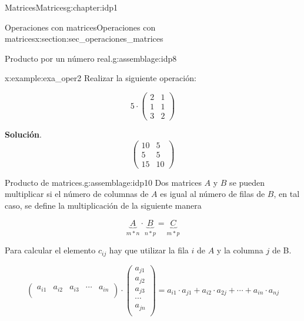 \documentclass[oneside,12pt,]{book}
\newcommand{\blocktitlefont}{\relax}
\newcommand{\amp}{&}
\begin{document}
\begin{chapterptx}{Matrices}{}{Matrices}{}{}{g:chapter:idp1}
\begin{sectionptx}{Operaciones con matrices}{}{Operaciones con matrices}{}{}{x:section:sec_operaciones_matrices}
\begin{assemblage}{Producto por un número real.}{g:assemblage:idp8}
%
\end{assemblage}
\begin{example}{}{x:example:exa_oper2}%
Realizar la siguiente operación:%
\par
%
\begin{equation*}
5\cdot\begin{pmatrix}
2 \amp 1 \\
1 \amp 1 \\
3 \amp 2
\end{pmatrix}
\end{equation*}
%
\par\smallskip%
\noindent\textbf{\blocktitlefont Solución}.\hypertarget{g:solution:idp9}{}\quad{}%
\begin{equation*}
\begin{pmatrix}
10 \amp 5 \\
5 \amp 5 \\
15 \amp 10
\end{pmatrix}  
\end{equation*}
%
\end{example}
\begin{assemblage}{Producto de matrices.}{g:assemblage:idp10}%
Dos matrices \(A\) y \(B\) se pueden multiplicar si el número de columnas de \(A\) es igual al número de filas de \(B\), en tal caso, se define la multiplicación de la siguiente manera%
\par
%
\begin{equation*}
\underbrace{A}_{m \ast n} \cdot \underbrace{B}_{n\ast p}=\underbrace{C}_{m\ast p}
\end{equation*}
%
\par
Para calcular el elemento \(c_{ij}\) hay que utilizar la fila \(i\) de \(A\) y la columna \(j\) de B.%
\par
%
\begin{equation*}
\begin{pmatrix}
a_{i1} \amp a_{i2}\amp a_{i3}\amp \cdots \amp a_{in} \\
\end{pmatrix}
\cdot
\begin{pmatrix}
a_{j1} \\ a_{j2}\\a_{j3}\\ \cdots \\a_{jn} \\
\end{pmatrix}=a_{i1}\cdot a_{j1}+ a_{i2} \cdot a_{2j} + \cdots +a_{in}\cdot a_{nj}
\end{equation*}
%
\par

\end{assemblage}
\end{sectionptx}
\end{chapterptx}
\end{document}
